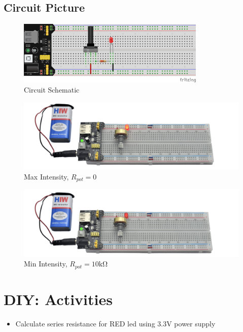 \subsection{Circuit Picture}
\begin{figure}[htp]
    \centering
    \includegraphics[width=0.8\textwidth]{Pictures/lesson_circuits/LEDs/lesson_3.png}
    \caption{Circuit Schematic}
    \label{fig:pot_led_sch}
\end{figure}
\begin{figure}[htp]
    \centering
    \includegraphics[width=\textwidth]{Pictures/lesson_circuits/LEDs/LC_4.png}
    \caption{Max Intensity, $R_{pot} = 0$}
    \label{fig:pot_led_max}
\end{figure}
\begin{figure}[htp]
    \centering
    \includegraphics[width=\textwidth]{Pictures/lesson_circuits/LEDs/LC_5.png}
    \caption{Min Intensity, $R_{pot} = 10\si{\kilo\ohm}$}
    \label{fig:pot_led_min}
\end{figure}



\section{DIY: Activities}
\begin{itemize}
    \item Calculate series resistance for RED led using 3.3V power supply
\end{itemize}

